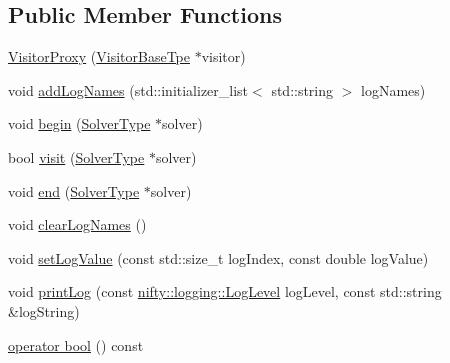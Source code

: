 \subsection*{Public Member Functions}
\begin{DoxyCompactItemize}
\item 
\hyperlink{classnifty_1_1graph_1_1opt_1_1common_1_1VisitorProxy_a076951383b327e8e3cd50bad38020f5a}{Visitor\+Proxy} (\hyperlink{classnifty_1_1graph_1_1opt_1_1common_1_1VisitorProxy_a6828e049755dc2f473d15558c488e33b}{Visitor\+Base\+Tpe} $\ast$visitor)
\item 
void \hyperlink{classnifty_1_1graph_1_1opt_1_1common_1_1VisitorProxy_a2511081cdc30c196f6d6da20773e3e28}{add\+Log\+Names} (std\+::initializer\+\_\+list$<$ std\+::string $>$ log\+Names)
\item 
void \hyperlink{classnifty_1_1graph_1_1opt_1_1common_1_1VisitorProxy_ad3db841200cd5c415c4d8b9e675731de}{begin} (\hyperlink{classnifty_1_1graph_1_1opt_1_1common_1_1VisitorProxy_adf9a1e3e32a8a5ed163501888a817eff}{Solver\+Type} $\ast$solver)
\item 
bool \hyperlink{classnifty_1_1graph_1_1opt_1_1common_1_1VisitorProxy_a78b19aa3247ad044f62f81fbd10293b7}{visit} (\hyperlink{classnifty_1_1graph_1_1opt_1_1common_1_1VisitorProxy_adf9a1e3e32a8a5ed163501888a817eff}{Solver\+Type} $\ast$solver)
\item 
void \hyperlink{classnifty_1_1graph_1_1opt_1_1common_1_1VisitorProxy_ad7a669455e7aed7d461cb5451c145a85}{end} (\hyperlink{classnifty_1_1graph_1_1opt_1_1common_1_1VisitorProxy_adf9a1e3e32a8a5ed163501888a817eff}{Solver\+Type} $\ast$solver)
\item 
void \hyperlink{classnifty_1_1graph_1_1opt_1_1common_1_1VisitorProxy_a88207ba15823474b48e9ed6a440dd2f2}{clear\+Log\+Names} ()
\item 
void \hyperlink{classnifty_1_1graph_1_1opt_1_1common_1_1VisitorProxy_a602a7f47e02cacce5494f997d50ec995}{set\+Log\+Value} (const std\+::size\+\_\+t log\+Index, const double log\+Value)
\item 
void \hyperlink{classnifty_1_1graph_1_1opt_1_1common_1_1VisitorProxy_a3ffeff94af967bfdc8558b9f9df589c9}{print\+Log} (const \hyperlink{namespacenifty_1_1logging_a3385625f9a0dbb17f70c47d3fca2f64d}{nifty\+::logging\+::\+Log\+Level} log\+Level, const std\+::string \&log\+String)
\item 
\hyperlink{classnifty_1_1graph_1_1opt_1_1common_1_1VisitorProxy_a6f9ad0829cc73fcb01f1d98bf4a9526e}{operator bool} () const
\end{DoxyCompactItemize}


